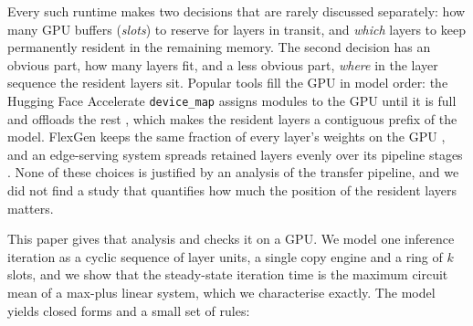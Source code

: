 \documentclass[final,5p,times,twocolumn]{elsarticle}
\theoremstyle{definition}
\begin{document}
Every such runtime makes two decisions that are rarely discussed separately: how many GPU buffers (\emph{slots}) to reserve for layers in transit, and \emph{which} layers to keep permanently resident in the remaining memory. The second decision has an obvious part, how many layers fit, and a less obvious part, \emph{where} in the layer sequence the resident layers sit. Popular tools fill the GPU in model order: the Hugging Face Accelerate \texttt{device\_map} assigns modules to the GPU until it is full and offloads the rest \cite{hf2024accelerate}, which makes the resident layers a contiguous prefix of the model. FlexGen keeps the same fraction of every layer's weights on the GPU \cite{sheng2023flexgen}, and an edge-serving system spreads retained layers evenly over its pipeline stages \cite{sun2025loip}. None of these choices is justified by an analysis of the transfer pipeline, and we did not find a study that quantifies how much the position of the resident layers matters.

This paper gives that analysis and checks it on a GPU. We model one inference iteration as a cyclic sequence of layer units, a single copy engine and a ring of $k$ slots, and we show that the steady-state iteration time is the maximum circuit mean of a max-plus linear system, which we characterise exactly. The model yields closed forms and a small set of rules:
\end{document}
